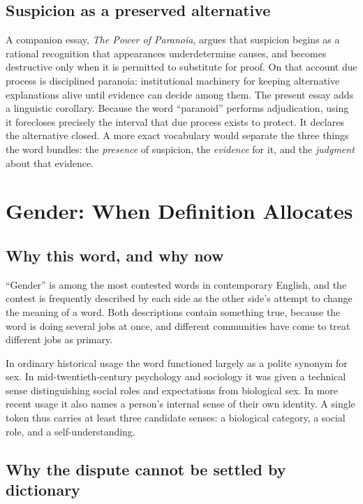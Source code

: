 \documentclass[11pt,a4paper]{article}
\theoremstyle{plain}
\theoremstyle{definition}
\theoremstyle{remark}
\begin{document}
\subsection{Suspicion as a preserved alternative}

A companion essay, \emph{The Power of Paranoia}, argues that suspicion begins as a rational recognition that appearances underdetermine causes, and becomes destructive only when it is permitted to substitute for proof. On that account due process is disciplined paranoia: institutional machinery for keeping alternative explanations alive until evidence can decide among them. The present essay adds a linguistic corollary. Because the word ``paranoid'' performs adjudication, using it forecloses precisely the interval that due process exists to protect. It declares the alternative closed. A more exact vocabulary would separate the three things the word bundles: the \emph{presence} of suspicion, the \emph{evidence} for it, and the \emph{judgment} about that evidence.

\section{Gender: When Definition Allocates}

\subsection{Why this word, and why now}

``Gender'' is among the most contested words in contemporary English, and the contest is frequently described by each side as the other side's attempt to change the meaning of a word. Both descriptions contain something true, because the word is doing several jobs at once, and different communities have come to treat different jobs as primary.

In ordinary historical usage the word functioned largely as a polite synonym for sex. In mid-twentieth-century psychology and sociology it was given a technical sense distinguishing social roles and expectations from biological sex. In more recent usage it also names a person's internal sense of their own identity. A single token thus carries at least three candidate senses: a biological category, a social role, and a self-understanding.

\subsection{Why the dispute cannot be settled by dictionary}
\end{document}
